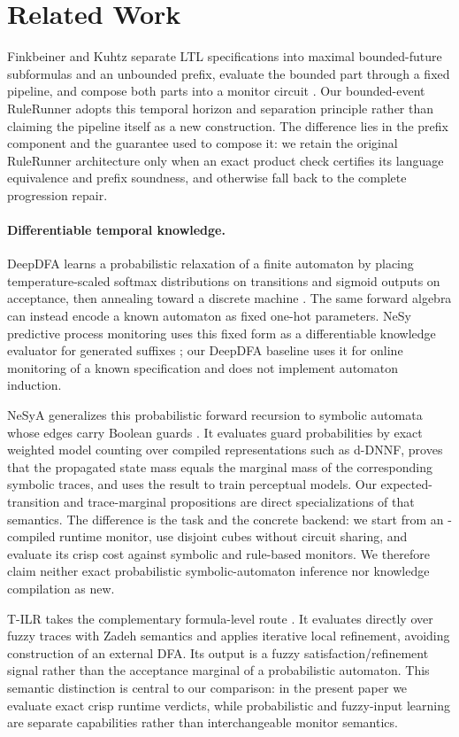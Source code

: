 \section{Related Work}

Finkbeiner and Kuhtz separate LTL specifications into maximal bounded-future
subformulas and an unbounded prefix, evaluate the bounded part through a fixed
pipeline, and compose both parts into a monitor circuit
\cite{finkbeiner2009monitor}.  Our bounded-event RuleRunner adopts this temporal
horizon and separation principle rather than claiming the pipeline itself as a
new construction.  The difference lies in the prefix component and the
guarantee used to compose it: we retain the original RuleRunner architecture
only when an exact product check certifies its language equivalence and prefix
soundness, and otherwise fall back to the complete progression repair.

\paragraph{Differentiable temporal knowledge.}
DeepDFA learns a probabilistic relaxation of a finite automaton by placing
temperature-scaled softmax distributions on transitions and sigmoid outputs on
acceptance, then annealing toward a discrete machine
\cite{deepdfa_ecai2024}.  The same forward algebra can instead encode a known
automaton as fixed one-hot parameters.  NeSy predictive process monitoring uses
this fixed form as a differentiable knowledge evaluator for generated suffixes
\cite{mezini2025neuro}; our DeepDFA baseline uses it for online monitoring of a
known \ltlf specification and does not implement automaton induction.

NeSyA generalizes this probabilistic forward recursion to symbolic automata
whose edges carry Boolean guards \cite{NesyA}.  It evaluates guard probabilities
by exact weighted model counting over compiled representations such as d-DNNF,
proves that the propagated state mass equals the marginal mass of the
corresponding symbolic traces, and uses the result to train perceptual models.
Our expected-transition and trace-marginal propositions are direct
specializations of that semantics.  The difference is the task and the concrete
backend: we start from an \ltlf-compiled runtime monitor, use disjoint cubes
without circuit sharing, and evaluate its crisp cost against symbolic and
rule-based monitors.  We therefore claim neither exact probabilistic
symbolic-automaton inference nor knowledge compilation as new.

T-ILR takes the complementary formula-level route
\cite{t_ilr_2025}.  It evaluates \ltlf directly over fuzzy traces with Zadeh
semantics and applies iterative local refinement, avoiding construction of an
external DFA.  Its output is a fuzzy satisfaction/refinement signal rather than
the acceptance marginal of a probabilistic automaton.  This semantic distinction
is central to our comparison: in the present paper we evaluate exact crisp
runtime verdicts, while probabilistic and fuzzy-input learning are separate
capabilities rather than interchangeable monitor semantics.
